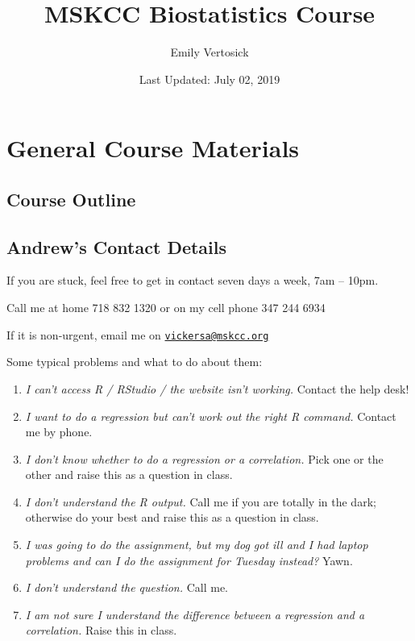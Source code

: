 \documentclass[]{book}
\title{MSKCC Biostatistics Course}
\author{Emily Vertosick}
\date{Last Updated: July 02, 2019}
\providecommand{\tightlist}{%
  \setlength{\itemsep}{0pt}\setlength{\parskip}{0pt}}
\begin{document}
\maketitle

\hypertarget{general-course-materials}{%
\chapter*{General Course Materials}\label{general-course-materials}}

\hypertarget{course-outline}{%
\section*{Course Outline}\label{course-outline}}

\hypertarget{andrews-contact-details}{%
\section*{Andrew's Contact Details}\label{andrews-contact-details}}

If you are stuck, feel free to get in contact seven days a week, 7am --
10pm.

Call me at home 718 832 1320 or on my cell phone 347 244 6934

If it is non-urgent, email me on
\href{mailto:vickersa@mskcc.org}{\nolinkurl{vickersa@mskcc.org}}

Some typical problems and what to do about them:

\begin{enumerate}
\def\labelenumi{\arabic{enumi}.}
\tightlist
\item
  \emph{I can't access R / RStudio / the website isn't working.} Contact
  the help desk!
\item
  \emph{I want to do a regression but can't work out the right R
  command.} Contact me by phone.
\item
  \emph{I don't know whether to do a regression or a correlation.} Pick
  one or the other and raise this as a question in class.
\item
  \emph{I don't understand the R output.} Call me if you are totally in
  the dark; otherwise do your best and raise this as a question in
  class.
\item
  \emph{I was going to do the assignment, but my dog got ill and I had
  laptop problems and can I do the assignment for Tuesday instead?}
  Yawn.
\item
  \emph{I don't understand the question.} Call me.
\item
  \emph{I am not sure I understand the difference between a regression
  and a correlation.} Raise this in class.
\end{enumerate}
\end{document}
